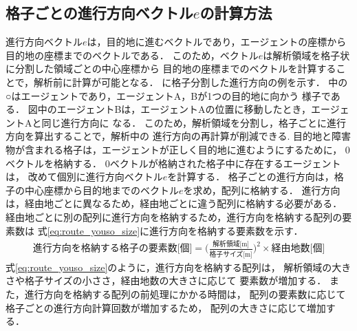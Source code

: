 
\subsection{格子ごとの進行方向ベクトル$e$の計算方法}
進行方向ベクトル$e$は，目的地に進むベクトルであり，エージェントの座標から
目的地の座標までのベクトルである．
このため，ベクトル$e$は解析領域を格子状に分割した領域ごとの中心座標から
目的地の座標までのベクトルを計算することで，解析前に計算が可能となる．
に格子分割した進行方向の例を示す．
%
%
中の○はエージェントであり，エージェントA，Bが1つの目的地に向かう
様子である．
図中のエージェントBは，エージェントAの位置に移動したとき，エージェントAと同じ進行方向に
なる．
このため，解析領域を分割し，格子ごとに進行方向を算出することで，解析中の
進行方向の再計算が削減できる.	
目的地と障害物が含まれる格子は，エージェントが正しく目的地に進むようにするために，
0ベクトルを格納する．
0ベクトルが格納された格子中に存在するエージェントは，
改めて個別に進行方向ベクトル$e$を計算する．
格子ごとの進行方向は，格子の中心座標から目的地までのベクトル$e$を求め，配列に格納する．
進行方向は，経由地ごとに異なるため，経由地ごとに違う配列に格納する必要がある．
経由地ごとに別の配列に進行方向を格納するため，進行方向を格納する配列の要素数は
式\eqref{eq:route_youso_size}に進行方向を格納する要素数を示す．
%
\begin{eqnarray}
 \mbox{進行方向を格納する格子の要素数[個]} =  \Big( \frac{\mbox{解析領域[m]}}{\mbox{格子サイズ[m]}} \Big) ^ 2 \times  \mbox{経由地数[個]}
 \label{eq:route_youso_size}
\end{eqnarray}
%
式\eqref{eq:route_youso_size}のように，進行方向を格納する配列は，
解析領域の大きさや格子サイズの小ささ，経由地数の大きさに応じて
要素数が増加する．
また，進行方向を格納する配列の前処理にかかる時間は，
配列の要素数に応じて格子ごとの進行方向計算回数が増加するため，
配列の大きさに応じて増加する．



